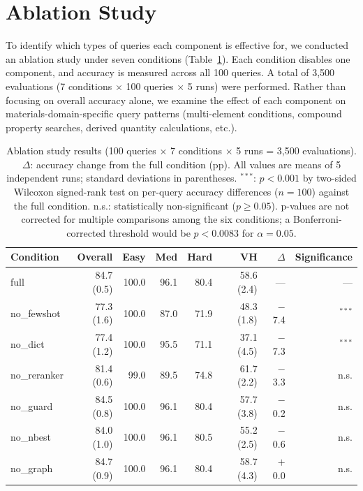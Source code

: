 \documentclass{npj-compt.mater}
\begin{document}
\section{Ablation Study}
\label{sec:ablation}

To identify which types of queries each component is effective for,
we conducted an ablation study under seven conditions
(Table~\ref{tab:ablation}).
Each condition disables one component, and accuracy is measured
across all 100 queries.
A total of 3{,}500 evaluations (7 conditions $\times$ 100 queries
$\times$ 5 runs) were performed.
Rather than focusing on overall accuracy alone, we examine the
effect of each component on materials-domain-specific query
patterns (multi-element conditions, compound property searches,
derived quantity calculations, etc.).

\begin{table}[t]
\centering
\caption{Ablation study results (100 queries $\times$ 7 conditions
$\times$ 5 runs = 3{,}500 evaluations).
$\Delta$: accuracy change from the full condition (pp).
All values are means of 5 independent runs; standard deviations
in parentheses.
$^{***}$: $p<0.001$ by two-sided Wilcoxon signed-rank test on
per-query accuracy differences ($n=100$) against the full condition.
n.s.: statistically non-significant ($p\geq 0.05$).
p-values are not corrected for multiple comparisons among the six
conditions; a Bonferroni-corrected threshold would be
$p<0.0083$ for $\alpha=0.05$.}
\label{tab:ablation}
\small
\begin{tabular}{@{}lrrrrrrr@{}}
\toprule
Condition & Overall & Easy & Med & Hard & VH & $\Delta$ & Significance \\
\midrule
full          & 84.7 (0.5) & 100.0 & 96.1 & 80.4 & 58.6 (2.4) & ---    & --- \\
no\_fewshot   & 77.3 (1.6) & 100.0 & 87.0 & 71.9 & 48.3 (1.8) & $-$7.4  & $^{***}$ \\
no\_dict      & 77.4 (1.2) & 100.0 & 95.5 & 71.1 & 37.1 (4.5) & $-$7.3  & $^{***}$ \\
no\_reranker  & 81.4 (0.6) & 99.0 & 89.5 & 74.8 & 61.7 (2.2) & $-$3.3  & n.s. \\
no\_guard     & 84.5 (0.8) & 100.0 & 96.1 & 80.4 & 57.7 (3.8) & $-$0.2  & n.s. \\
no\_nbest     & 84.0 (1.0) & 100.0 & 96.1 & 80.5 & 55.2 (2.5) & $-$0.6  & n.s. \\
no\_graph     & 84.7 (0.9) & 100.0 & 96.1 & 80.4 & 58.7 (4.3) & $+$0.0  & n.s. \\
\bottomrule
\end{tabular}
\end{table}
\end{document}
